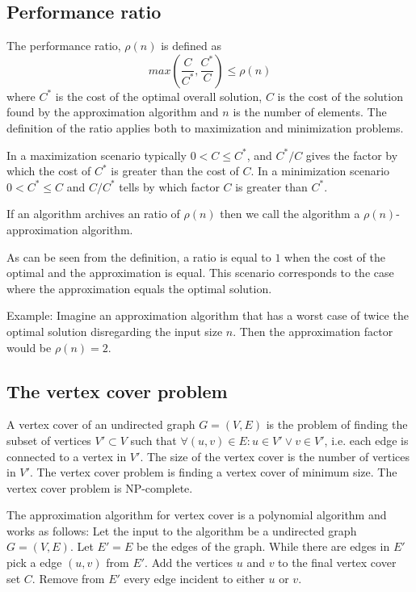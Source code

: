 \documentclass[10pt]{article}
\begin{document}
\subsection{Performance ratio} %
\label{sub:performance_ratio}
The performance ratio, $\rho(n)$ is defined as
\begin{equation}
  max(\frac{C}{C^*}, \frac{C^*}{C}) \label{eqapprox0} \leq \rho(n)
\end{equation}
where $C^*$ is the cost of the optimal overall solution, $C$ is the cost of the solution found by the approximation algorithm and $n$ is the number of elements. The definition of the ratio applies both to maximization and minimization problems. 

In a maximization scenario typically $0 < C \leq C^*$, and $C^*/C$ gives the factor by which the cost of $C^*$ is greater than the cost of $C$. In a minimization scenario $0 < C^* \leq C$ and $C/C^*$ tells by which factor $C$ is greater than $C^*$.

If an algorithm archives an ratio of $\rho(n)$ then we call the algorithm a $\rho(n)$-approximation algorithm.

As can be seen from the definition, a ratio is equal to $1$ when the cost of the optimal and the approximation is equal. This scenario corresponds to the case where the approximation equals the optimal solution.

Example: Imagine an approximation algorithm that has a worst case of twice the optimal solution disregarding the input size $n$. Then the approximation factor would be $\rho(n)=2$.


\subsection{The vertex cover problem} %
\label{sub:the_vertex_cover_problem}

A vertex cover of an undirected graph $G=(V,E)$ is the problem of finding the subset of vertices $V' \subset V$ such that $\forall (u,v) \in E: u \in V' \vee v \in V'$, i.e. each edge is connected to a vertex in $V'$. The size of the vertex cover is the number of vertices in $V'$. The vertex cover problem is finding a vertex cover of minimum size. The vertex cover problem is NP-complete. 

The approximation algorithm for vertex cover is a polynomial algorithm and works as follows: Let the input to the algorithm be a undirected graph $G = (V,E)$. Let $E' = E$ be the edges of the graph. While there are edges in $E'$ pick a edge $(u,v)$ from $E'$. Add the vertices $u$ and $v$ to the final vertex cover set $C$. Remove from $E'$ every edge incident to either $u$ or $v$.
\end{document}
